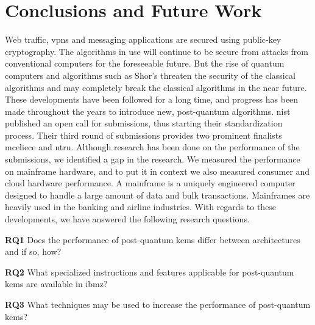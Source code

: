 \chapter{Conclusions and Future Work}
\label{chapter:conclusion}

\noindent Web traffic, \glspl{vpn} and messaging applications are secured using public-key cryptography. The algorithms in use will continue to be secure from attacks from conventional computers for the foreseeable future.  But the rise of quantum computers and algorithms such as Shor's threaten the security of the classical algorithms and may completely break the classical algorithms in the near future. These developments have been followed for a long time, and progress has been made throughout the years to introduce new, post-quantum algorithms. \acrfull{nist} published an open call for submissions, thus starting their standardization process. Their third round of submissions provides two prominent finalists \gls{mceliece} and \gls{ntru}. Although research has been done on the performance of the submissions, we identified a gap in the research. We measured the performance on mainframe hardware, and to put it in context we also measured consumer and cloud hardware performance. A mainframe is a uniquely engineered computer designed to handle a large amount of data and bulk transactions. Mainframes are heavily used in the banking and airline industries. With regards to these developments, we have answered the following research questions.


\begin{description}
    \item \textbf{RQ1} Does the performance of \gls{post-quantum} \glspl{kem} differ between architectures and if so, how?
    
    \item \textbf{RQ2} What specialized instructions and features applicable for \gls{post-quantum} \glspl{kem} are available in \gls{ibmz}?
    
    \item \textbf{RQ3} What techniques may be used to increase the performance of \gls{post-quantum} \glspl{kem}?
\end{description}


